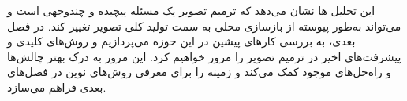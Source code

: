 این تحلیل ها نشان می‌دهد که ترمیم تصویر یک مسئله پیچیده و چندوجهی است و می‌تواند به‌طور پیوسته از بازسازی محلی به سمت تولید کلی تصویر تغییر کند. در فصل بعدی، به بررسی کارهای پیشین در این حوزه می‌پردازیم و روش‌های کلیدی و پیشرفت‌های اخیر در ترمیم تصویر را مرور خواهیم کرد. این مرور به درک بهتر چالش‌ها و راه‌حل‌های موجود کمک می‌کند و زمینه را برای معرفی روش‌های نوین در فصل‌های بعدی فراهم می‌سازد.
